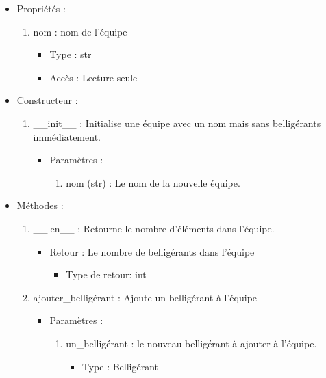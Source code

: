 \documentclass[12pt,pdftex,oneside]{article}
\begin{document}
  \begin{itemize}
  \item Propriétés : 
    \begin{enumerate}
    \item nom : nom de l'équipe
          \begin{itemize}
          \item Type : str
          \item Accès : Lecture seule
          \end{itemize}

    \end{enumerate}

  \item Constructeur : 

  \begin{enumerate}
  \item \_\_init\_\_ : Initialise une équipe avec un nom mais sans belligérants
    immédiatement.
    \begin{itemize}
    \item Paramètres : 
      \begin{enumerate}
      \item nom (str) : Le nom de la nouvelle équipe.
      \end{enumerate}
    \end{itemize}

  \end{enumerate}

  \item Méthodes : 

    \begin{enumerate}
    \item \_\_len\_\_ : Retourne le nombre d'éléments dans l'équipe.
      \begin{itemize}
      \item Retour : Le nombre de belligérants dans l'équipe
          \begin{itemize}
          \item Type de retour: int
          \end{itemize}
      \end{itemize}

    \item ajouter\_belligérant : Ajoute un belligérant à l'équipe
      \begin{itemize}
      \item Paramètres : 
        \begin{enumerate}
        \item un\_belligérant : le nouveau belligérant à ajouter à l'équipe.
          \begin{itemize}
          \item Type : Belligérant
          \end{itemize}
        \end{enumerate}
      \end{itemize}


\end{enumerate}
\end{itemize}
\end{document}
